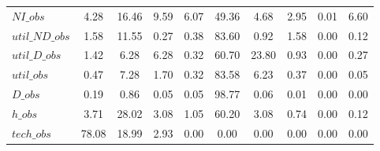 \begin{center}
\begin{longtable}{lccccccccc}
$NI\_obs        $	 & 	         4.28	 & 	        16.46	 & 	         9.59	 & 	         6.07	 & 	        49.36	 & 	         4.68	 & 	         2.95	 & 	         0.01	 & 	         6.60 \\ 
$util\_ND\_obs  $	 & 	         1.58	 & 	        11.55	 & 	         0.27	 & 	         0.38	 & 	        83.60	 & 	         0.92	 & 	         1.58	 & 	         0.00	 & 	         0.12 \\ 
$util\_D\_obs   $	 & 	         1.42	 & 	         6.28	 & 	         6.28	 & 	         0.32	 & 	        60.70	 & 	        23.80	 & 	         0.93	 & 	         0.00	 & 	         0.27 \\ 
$util\_obs      $	 & 	         0.47	 & 	         7.28	 & 	         1.70	 & 	         0.32	 & 	        83.58	 & 	         6.23	 & 	         0.37	 & 	         0.00	 & 	         0.05 \\ 
$D\_obs         $	 & 	         0.19	 & 	         0.86	 & 	         0.05	 & 	         0.05	 & 	        98.77	 & 	         0.06	 & 	         0.01	 & 	         0.00	 & 	         0.00 \\ 
$h\_obs         $	 & 	         3.71	 & 	        28.02	 & 	         3.08	 & 	         1.05	 & 	        60.20	 & 	         3.08	 & 	         0.74	 & 	         0.00	 & 	         0.12 \\ 
$tech\_obs      $	 & 	        78.08	 & 	        18.99	 & 	         2.93	 & 	         0.00	 & 	         0.00	 & 	         0.00	 & 	         0.00	 & 	         0.00	 & 	         0.00 \\ 
\end{longtable}
 \end{center}
